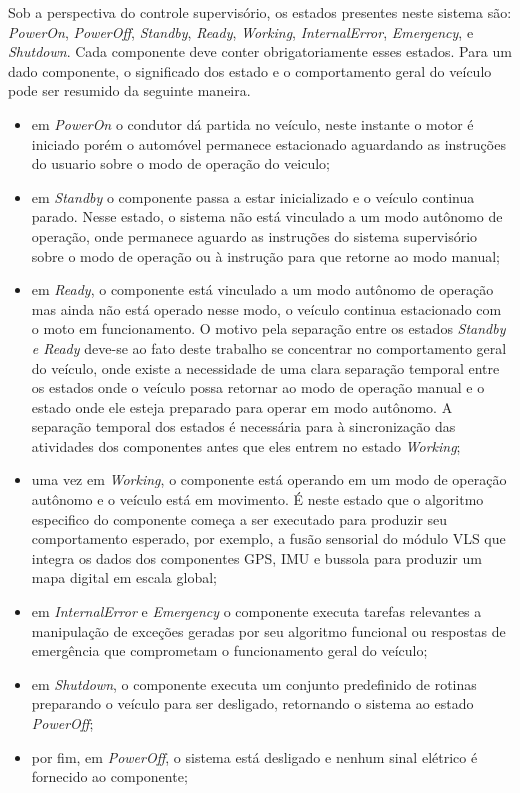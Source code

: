 \documentclass[conference]{IEEEtran}
\begin{document}
Sob a perspectiva do controle supervisório, os estados presentes neste sistema são: \textit{PowerOn}, \textit{PowerOff}, \textit{Standby}, \textit{Ready}, \textit{Working}, \textit{InternalError}, \textit{Emergency}, e \textit{Shutdown}.
Cada componente deve conter obrigatoriamente esses estados. Para um dado componente, o significado dos estado e o comportamento geral do veículo pode ser resumido da seguinte maneira.

\begin{itemize}

	\item em \textit{PowerOn} o condutor dá partida no veículo, neste instante o motor é iniciado porém o automóvel permanece estacionado aguardando as instruções do usuario sobre o modo de operação do veiculo;
		
	\item em \textit{Standby} o componente passa a estar inicializado e o veículo continua parado. Nesse estado, o sistema não está vinculado a um modo autônomo de operação, onde permanece aguardo as instruções do sistema supervisório sobre o modo de operação ou à instrução para que retorne ao modo manual;
	
	\item em \textit{Ready}, o componente está vinculado a um modo autônomo de operação mas ainda não está operado nesse modo, o veículo continua estacionado com o moto em funcionamento. O motivo pela separação entre os estados \textit{Standby e Ready} deve-se ao fato deste trabalho se concentrar no comportamento geral do veículo, onde existe a necessidade de uma clara separação temporal entre os estados onde o veículo possa retornar ao modo de operação manual e o estado onde ele esteja preparado para operar em modo autônomo. A separação temporal dos estados é necessária para à sincronização das atividades dos componentes antes que eles entrem no estado \textit{Working};
	
	\item uma vez em \textit{Working}, o componente está operando em um modo de operação autônomo e o veículo está em movimento. É neste estado que o algoritmo especifico do componente começa a ser executado para produzir seu comportamento esperado, por exemplo, a fusão sensorial do módulo VLS que integra os dados dos componentes GPS, IMU e bussola para produzir um mapa digital em escala global;
	
	\item em \textit{InternalError} e \textit{Emergency} o componente executa tarefas relevantes a manipulação de exceções geradas por seu algoritmo funcional ou respostas de emergência que comprometam o funcionamento geral do veículo;
	
	\item em \textit{Shutdown}, o componente executa um conjunto predefinido de rotinas preparando o veículo para ser desligado, retornando o sistema ao estado \textit{PowerOff};
	
	\item por fim, em \textit{PowerOff}, o sistema está desligado e nenhum sinal elétrico é fornecido ao componente;
\end{itemize}
\end{document}
